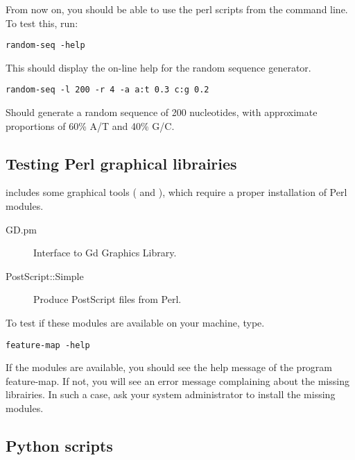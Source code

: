 \documentclass{book}
\begin{document}
From now on, you should be able to use the perl scripts from the
command line. To test this, run:

\begin{footnotesize}
\begin{verbatim}
random-seq -help
\end{verbatim}
\end{footnotesize}


This should display the on-line help for the random sequence
generator.

\begin{footnotesize}
\begin{verbatim}
random-seq -l 200 -r 4 -a a:t 0.3 c:g 0.2
\end{verbatim}
\end{footnotesize}

Should generate a random sequence of 200 nucleotides, with approximate
proportions of 60\% A/T and 40\% G/C.


\subsection{Testing Perl graphical librairies}

\RSAT includes some graphical tools ( and
), which require a proper installation of Perl
modules.

\begin{description}
\item[GD.pm] Interface to Gd Graphics Library.
\item[PostScript::Simple]  Produce PostScript files from Perl.
\end{description}

To test if these modules are available on your machine, type.

\begin{footnotesize}
\begin{verbatim}
feature-map -help
\end{verbatim}
\end{footnotesize}

If the modules are available, you should see the help message of the
program feature-map. If not, you will see an error message complaining
about the missing librairies. In such a case, ask your system
administrator to install the missing modules.

\subsection{Python scripts}
\end{document}
